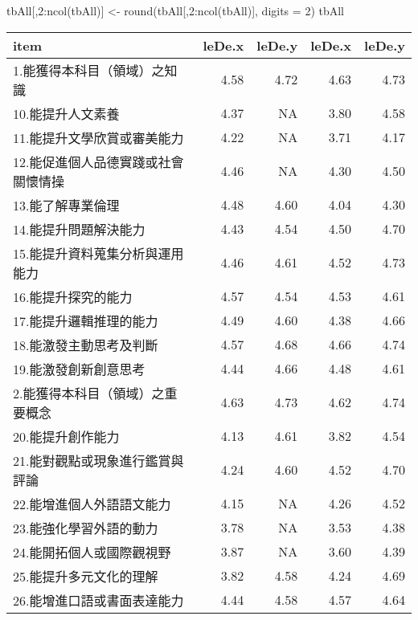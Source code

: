 \documentclass[
]{book}
\newenvironment{Shaded}{\begin{snugshade}}{\end{snugshade}}
\newcommand{\AttributeTok}[1]{\textcolor[rgb]{0.77,0.63,0.00}{#1}}
\newcommand{\DecValTok}[1]{\textcolor[rgb]{0.00,0.00,0.81}{#1}}
\newcommand{\FunctionTok}[1]{\textcolor[rgb]{0.00,0.00,0.00}{#1}}
\newcommand{\NormalTok}[1]{#1}
\newcommand{\OtherTok}[1]{\textcolor[rgb]{0.56,0.35,0.01}{#1}}
\newcommand{\SpecialCharTok}[1]{\textcolor[rgb]{0.00,0.00,0.00}{#1}}
\begin{document}
\begin{Shaded}
\begin{Highlighting}[]
\NormalTok{tbAll[,}\DecValTok{2}\SpecialCharTok{:}\FunctionTok{ncol}\NormalTok{(tbAll)] }\OtherTok{\textless{}{-}} \FunctionTok{round}\NormalTok{(tbAll[,}\DecValTok{2}\SpecialCharTok{:}\FunctionTok{ncol}\NormalTok{(tbAll)], }\AttributeTok{digits =} \DecValTok{2}\NormalTok{)}
\NormalTok{tbAll}
\end{Highlighting}
\end{Shaded}

\begin{tabular}{l|r|r|r|r}
\hline
item & leDe.x & leDe.y & leDe.x & leDe.y\\
\hline
1.能獲得本科目（領域）之知識 & 4.58 & 4.72 & 4.63 & 4.73\\
\hline
10.能提升人文素養 & 4.37 & NA & 3.80 & 4.58\\
\hline
11.能提升文學欣賞或審美能力 & 4.22 & NA & 3.71 & 4.17\\
\hline
12.能促進個人品德實踐或社會關懷情操 & 4.46 & NA & 4.30 & 4.50\\
\hline
13.能了解專業倫理 & 4.48 & 4.60 & 4.04 & 4.30\\
\hline
14.能提升問題解決能力 & 4.43 & 4.54 & 4.50 & 4.70\\
\hline
15.能提升資料蒐集分析與運用能力 & 4.46 & 4.61 & 4.52 & 4.73\\
\hline
16.能提升探究的能力 & 4.57 & 4.54 & 4.53 & 4.61\\
\hline
17.能提升邏輯推理的能力 & 4.49 & 4.60 & 4.38 & 4.66\\
\hline
18.能激發主動思考及判斷 & 4.57 & 4.68 & 4.66 & 4.74\\
\hline
19.能激發創新創意思考 & 4.44 & 4.66 & 4.48 & 4.61\\
\hline
2.能獲得本科目（領域）之重要概念 & 4.63 & 4.73 & 4.62 & 4.74\\
\hline
20.能提升創作能力 & 4.13 & 4.61 & 3.82 & 4.54\\
\hline
21.能對觀點或現象進行鑑賞與評論 & 4.24 & 4.60 & 4.52 & 4.70\\
\hline
22.能增進個人外語語文能力 & 4.15 & NA & 4.26 & 4.52\\
\hline
23.能強化學習外語的動力 & 3.78 & NA & 3.53 & 4.38\\
\hline
24.能開拓個人或國際觀視野 & 3.87 & NA & 3.60 & 4.39\\
\hline
25.能提升多元文化的理解 & 3.82 & 4.58 & 4.24 & 4.69\\
\hline
26.能增進口語或書面表達能力 & 4.44 & 4.58 & 4.57 & 4.64\\

\end{tabular}
\end{document}
